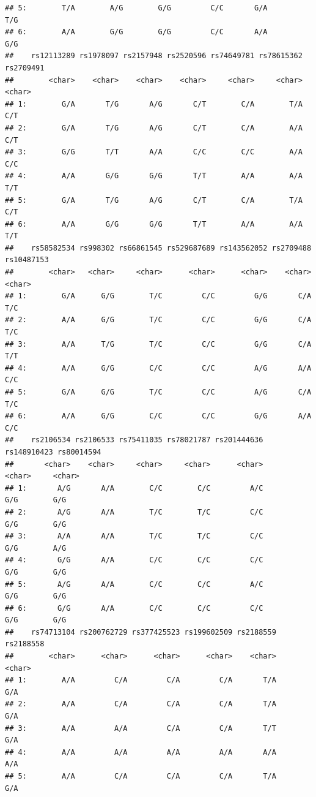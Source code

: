 \documentclass[
]{article}
\begin{document}
\begin{verbatim}
## 5:        T/A        A/G        G/G         C/C       G/A         T/G
## 6:        A/A        G/G        G/G         C/C       A/A         G/G
##    rs12113289 rs1978097 rs2157948 rs2520596 rs74649781 rs78615362 rs2709491
##        <char>    <char>    <char>    <char>     <char>     <char>    <char>
## 1:        G/A       T/G       A/G       C/T        C/A        T/A       C/T
## 2:        G/A       T/G       A/G       C/T        C/A        A/A       C/T
## 3:        G/G       T/T       A/A       C/C        C/C        A/A       C/C
## 4:        A/A       G/G       G/G       T/T        A/A        A/A       T/T
## 5:        G/A       T/G       A/G       C/T        C/A        T/A       C/T
## 6:        A/A       G/G       G/G       T/T        A/A        A/A       T/T
##    rs58582534 rs998302 rs66861545 rs529687689 rs143562052 rs2709488 rs10487153
##        <char>   <char>     <char>      <char>      <char>    <char>     <char>
## 1:        G/A      G/G        T/C         C/C         G/G       C/A        T/C
## 2:        A/A      G/G        T/C         C/C         G/G       C/A        T/C
## 3:        A/A      T/G        T/C         C/C         G/G       C/A        T/T
## 4:        A/A      G/G        C/C         C/C         A/G       A/A        C/C
## 5:        G/A      G/G        T/C         C/C         A/G       C/A        T/C
## 6:        A/A      G/G        C/C         C/C         G/G       A/A        C/C
##    rs2106534 rs2106533 rs75411035 rs78021787 rs201444636 rs148910423 rs80014594
##       <char>    <char>     <char>     <char>      <char>      <char>     <char>
## 1:       A/G       A/A        C/C        C/C         A/C         G/G        G/G
## 2:       A/G       A/A        T/C        T/C         C/C         G/G        G/G
## 3:       A/A       A/A        T/C        T/C         C/C         G/G        A/G
## 4:       G/G       A/A        C/C        C/C         C/C         G/G        G/G
## 5:       A/G       A/A        C/C        C/C         A/C         G/G        G/G
## 6:       G/G       A/A        C/C        C/C         C/C         G/G        G/G
##    rs74713104 rs200762729 rs377425523 rs199602509 rs2188559 rs2188558
##        <char>      <char>      <char>      <char>    <char>    <char>
## 1:        A/A         C/A         C/A         C/A       T/A       G/A
## 2:        A/A         C/A         C/A         C/A       T/A       G/A
## 3:        A/A         A/A         C/A         C/A       T/T       G/A
## 4:        A/A         A/A         A/A         A/A       A/A       A/A
## 5:        A/A         C/A         C/A         C/A       T/A       G/A

\end{verbatim}
\end{document}
